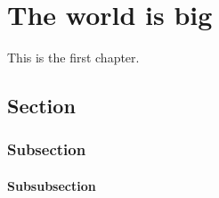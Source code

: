 \chapter{The world is big}

This is the first chapter.

\section{Section}

\subsection{Subsection}

\subsubsection{Subsubsection}
